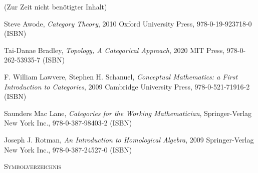 \documentclass[a4paper]{amsart}
\theoremstyle{definition}
\begin{document}
\begin{backup}
    (Zur Zeit nicht benötigter Inhalt)
\end{backup}

\begin{thebibliography}{9}
      Steve Awode, \emph{Category Theory},
      2010 Oxford University Press, 978-0-19-923718-0 (ISBN)

      Tai-Danae Bradley, \emph{Topology, A Categorical Approach},
      2020 MIT Press, 978-0-262-53935-7 (ISBN)

      F. William Lawvere, Stephen H. Schanuel, \emph{Conceptual Mathematics: a First Introduction to Categories},
      2009 Cambridge University Press, 978-0-521-71916-2 (ISBN)


      Saunders Mac Lane, \emph{Categories for the Working Mathematician},
      Springer-Verlag New York Inc., 978-0-387-98403-2 (ISBN)

   	Joseph J. Rotman, \emph{An Introduction to Homological Algebra},
   	2009 Springer-Verlag New York Inc., 978-0-387-24527-0 (ISBN)
      
\end{thebibliography}

\begin{large}
    \centerline{\textsc{Symbolverzeichnis}}
\end{large}
\bigskip

\renewcommand*{\arraystretch}{1}
\end{document}

